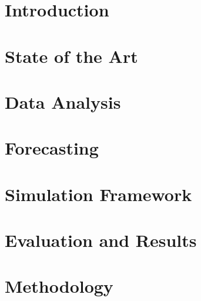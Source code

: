 \documentclass[a4paper,11pt,twoside]{memoir}
\begin{document}
\chapter{Introduction}
\label{ch:intro}



\chapter{State of the Art}
\label{ch:state_of_the_art}



\chapter{Data Analysis}
\label{ch:data_analysis}



\chapter{Forecasting}
\label{ch:forecasting}



\chapter{Simulation Framework}
\label{ch:simulation_framework}



\chapter{Evaluation and Results}
\label{ch:evaluation_and_results}



\chapter{Methodology}
\label{ch:methodology}
\end{document}
